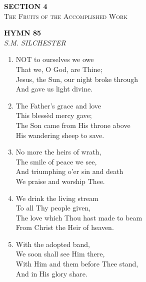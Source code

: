 \newpage
\thispagestyle{empty}
\vspace*{3.5cm}
\begin{center}
    {\LARGE \textbf{SECTION 4}}\\[0.8em]
    {\Large \textsc{The Fruits of the Accomplished Work}}
\end{center}
\vspace{3.5cm}

\newpage
\begin{center}
    {\Large \textbf{HYMN 85}}
    \\
    \textit{S.M. SILCHESTER}
\end{center}
\vspace{1em}

\begin{enumerate}
    \item NOT to ourselves we owe \\
        That we, O God, are Thine; \\
        Jesus, the Sun, our night broke through \\
        And gave us light divine.

    \item The Father's grace and love \\
        This bless\`ed mercy gave; \\
        The Son came from His throne above \\
        His wandering sheep to save.

    \item No more the heirs of wrath, \\
        The smile of peace we see, \\
        And triumphing o'er sin and death \\
        We praise and worship Thee.

    \item We drink the living stream \\
        To all Thy people given, \\
        The love which Thou hast made to beam \\
        From Christ the Heir of heaven.

    \item With the adopted band, \\
        We soon shall see Him there, \\
        With Him and them before Thee stand, \\
        And in His glory share.

\end{enumerate}

